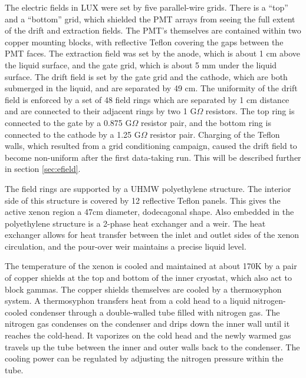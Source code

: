 The electric fields in LUX were set by five parallel-wire grids. There is a ``top'' and a ``bottom'' grid, which shielded the PMT arrays from seeing the full extent of the drift and extraction fields. The PMT's themselves are contained within two copper mounting blocks, with reflective Teflon covering the gaps between the PMT faces. The extraction field was set by the anode, which is about 1 cm above the liquid surface, and the gate grid, which is about 5 mm under the liquid surface. The drift field is set by the gate grid and the cathode, which are both submerged in the liquid, and are separated by 49 cm. The uniformity of the drift field is enforced by a set of 48 field rings which are separated by 1 cm distance and are connected to their adjacent rings by two 1 G$\Omega$ resistors. The top ring is connected to the gate by a 0.875 G$\Omega$ resistor pair, and the bottom ring is connected to the cathode by a 1.25 G$\Omega$ resistor pair. Charging of the Teflon walls, which resulted from a grid conditioning campaign, caused the drift field to become non-uniform after the first data-taking run. This will be described further in section \ref{sec:efield}.

The field rings are supported by a UHMW polyethylene structure. The interior side of this structure is covered by 12 reflective Teflon panels. This gives the active xenon region a 47cm diameter, dodecagonal shape. Also embedded in the polyethylene structure is a 2-phase heat exchanger and a weir. The heat exchanger allows for heat transfer between the inlet and outlet sides of the xenon circulation, and the pour-over weir maintains a precise liquid level.

The temperature of the xenon is cooled and maintained at about 170K by a pair of copper shields at the top and bottom of the inner cryostat, which also act to block gammas. The copper shields themselves are cooled by a thermosyphon system\cite{thermosyphon}. A thermosyphon transfers heat from a cold head to a liquid nitrogen-cooled condenser through a double-walled tube filled with nitrogen gas. The nitrogen gas condenses on the condenser and drips down the inner wall until it reaches the cold-head. It vaporizes on the cold head and the newly warmed gas travels up the tube between the inner and outer walls back to the condenser. The cooling power can be regulated by adjusting the nitrogen pressure within the tube.

